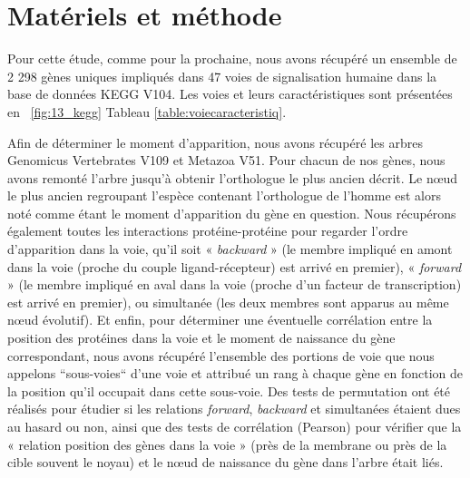 \section{Matériels et méthode}
\par Pour cette étude, comme pour la prochaine, nous avons récupéré un ensemble de 2 298 gènes uniques impliqués dans 47 voies de signalisation humaine dans la base de données KEGG V104. Les voies et leurs caractéristiques sont présentées en ~\ref{fig:13_kegg} Tableau \ref{table:voiecaracteristiq}. 
\par Afin de déterminer le moment d’apparition, nous avons récupéré les arbres Genomicus Vertebrates V109 et Metazoa V51. Pour chacun de nos gènes, nous avons remonté l’arbre jusqu’à obtenir l’orthologue le plus ancien décrit. Le nœud le plus ancien regroupant l’espèce contenant l’orthologue de l’homme est alors noté comme étant le moment d’apparition du gène en question. Nous récupérons également toutes les interactions protéine-protéine pour regarder l’ordre d’apparition dans la voie, qu’il soit « \textit{backward} » (le membre impliqué en amont dans la voie (proche du couple ligand-récepteur) est arrivé en premier), « \textit{forward} » (le membre impliqué en aval dans la voie (proche d’un facteur de transcription) est arrivé en premier), ou simultanée (les deux membres sont apparus au même nœud évolutif). Et enfin, pour déterminer une éventuelle corrélation entre la position des protéines dans la voie et le moment de naissance du gène correspondant, nous avons récupéré l’ensemble des portions de voie que nous appelons “sous-voies“ d’une voie et attribué un rang à chaque gène en fonction de la position qu’il occupait dans cette sous-voie. Des tests de permutation ont été réalisés pour étudier si les relations \textit{forward}, \textit{backward} et simultanées étaient dues au hasard ou non, ainsi que des tests de corrélation (Pearson) pour vérifier que la « relation position des gènes dans la voie » (près de la membrane ou près de la cible souvent le noyau) et le nœud de naissance du gène dans l’arbre était liés. 

